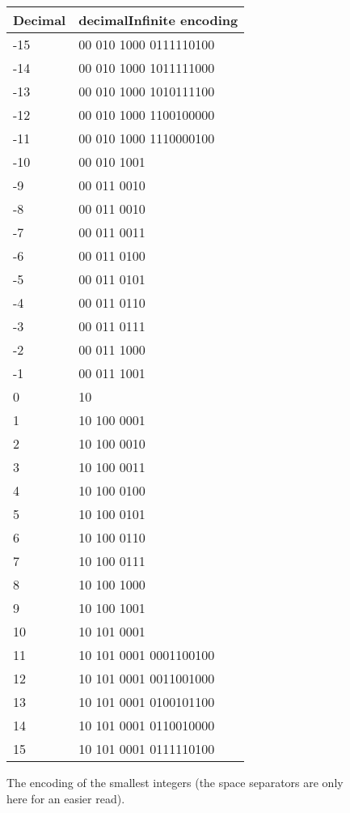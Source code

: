 \documentclass{acm_proc_article-sp}
\begin{document}
\begin{figure}
\caption{The encoding of the smallest integers (the space separators are only here for an easier read).}
\label{figure-first-integers}
\center
\begin{tabular}{|l|l|}
\hline
Decimal & decimalInfinite encoding \\
\hline
-15 & 00 010 1000 0111110100\\
\hline
-14 & 00 010 1000 1011111000\\
\hline
-13 & 00 010 1000 1010111100\\
\hline
-12 & 00 010 1000 1100100000\\
\hline
-11 & 00 010 1000 1110000100\\
\hline
-10 & 00 010 1001\\
\hline
-9 & 00 011 0010\\
\hline
-8 & 00 011 0010\\
\hline
-7 & 00 011 0011\\
\hline
-6 & 00 011 0100\\
\hline
-5 & 00 011 0101\\
\hline
-4 & 00 011 0110\\
\hline
-3 & 00 011 0111\\
\hline
-2 & 00 011 1000\\
\hline
-1 & 00 011 1001\\
\hline
0 & 10 \\
\hline
1 & 10 100 0001\\
\hline
2 & 10 100 0010\\
\hline
3 & 10 100 0011\\
\hline
4 & 10 100 0100\\
\hline
5 & 10 100 0101\\
\hline
6 & 10 100 0110\\
\hline
7 & 10 100 0111\\
\hline
8 & 10 100 1000\\
\hline
9 & 10 100 1001\\
\hline
10 & 10 101 0001\\
\hline
11 & 10 101 0001 0001100100\\
\hline
12 & 10 101 0001 0011001000\\
\hline
13 & 10 101 0001 0100101100\\
\hline
14 & 10 101 0001 0110010000\\
\hline
15 & 10 101 0001 0111110100\\
\hline
\hline
\end{tabular}
\end{figure}
\end{document}
